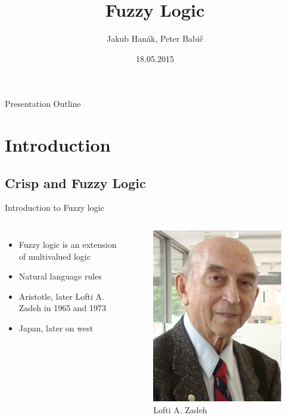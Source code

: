 \documentclass[hyperref={unicode}]{beamer}
\title[Fuzzy logic]{Fuzzy Logic}
\author{Jakub Hanák, Peter Babič}
\institute{Technical University of Košice, Slovakia}
\date{18.05.2015}
\begin{document}
\boldmath


\begin{frame}
	\titlepage
\end{frame}

\begin{frame}{Presentation Outline}
  \tableofcontents
\end{frame}



\section{Introduction}


\subsection{Crisp and Fuzzy Logic}

\begin{frame}{Introduction to Fuzzy logic}
	\begin{columns}
		\begin{itemize}
		\item Fuzzy logic is an extension of multivalued logic
		\item Natural language rules
		\item Aristotle, later Lofti A. Zadeh in 1965 and 1973
		\item Japan, later on west
		\end{itemize}

		\begin{figure}[b]
		\includegraphics{lofti.jpg}
		\caption{Lofti A. Zadeh}
		\end{figure}
	\end{columns}
\end{frame}
\end{document}
